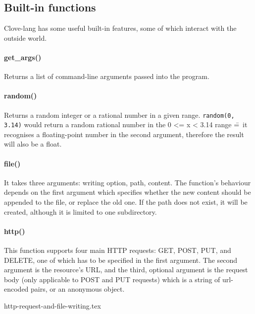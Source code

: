 \documentclass[12pt,a4paper]{article}
\begin{document}
\vspace{-1.5em}
\subsection*{Built-in functions}
Clove-lang has some useful built-in features, some of which interact with the outside world.

\paragraph*{get\_args()}
Returns a list of command-line arguments passed into the program.

\vspace{-0.75em}
\paragraph*{random()}
Returns a random integer or a rational number in a given range. \texttt{random(0, 3.14)} would return a random rational number in the 0 <= x < 3.14 range \==~it recognises a floating-point number in the second argument, therefore the result will also be a float.

\vspace{-0.75em}
\paragraph*{file()}
It takes three arguments: writing option, path, content. The function's behaviour depends on the first argument which specifies whether the new content should be appended to the file, or replace the old one. If the path does not exist, it will be created, although it is limited to one subdirectory.

\vspace{-0.75em}
\paragraph*{http()}
This function supports four main HTTP requests: GET, POST, PUT, and DELETE, one of which has to be specified in the first argument. The second argument is the resource's URL, and the third, optional argument is the request body (only applicable to POST and PUT requests) which is a string of url-encoded pairs, or an anonymous object.

{http-request-and-file-writing.tex}
\end{document}
